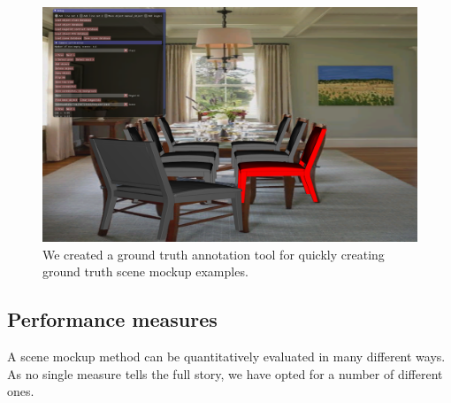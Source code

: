 \documentclass[10pt,twocolumn,letterpaper]{article}
\begin{document}
\begin{figure}
    \includegraphics[width=\linewidth]{figures/groundtruth_annotation/groundtruth_annotation}
    \caption[Annotation tool]{We created a ground truth annotation tool for quickly creating ground truth scene mockup examples.}
    \label{fig:ch4:gt_annotation}
\end{figure}

\subsection{Performance measures}
\label{sec:ch4:performance_measures}
A scene mockup method can be quantitatively evaluated in many different ways.
As no single measure tells the full story, we have opted for a number of
different ones. 
\end{document}
